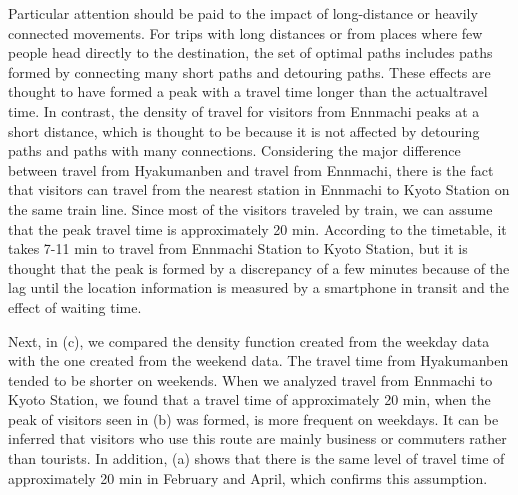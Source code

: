 \documentclass[conference]{IEEEtran}
\begin{document}
Particular attention should be paid to the impact of long-distance or heavily connected movements.
For trips with long distances or from places where few people head directly to the destination, the set of optimal paths includes paths formed by connecting many short paths and detouring paths.
These effects are thought to have formed a peak with a travel time longer than the actualtravel time.
In contrast, the density of travel for visitors from Ennmachi peaks at a short distance, which is thought to be because it is not affected by detouring paths and paths with many connections.
Considering the major difference between travel from Hyakumanben and travel from Ennmachi, there is the fact that visitors can travel from the nearest station in Ennmachi to Kyoto Station on the same train line.
Since most of the visitors traveled by train, we can assume that the peak travel time is approximately 20 min.
According to the timetable, it takes 7-11 min to travel from Ennmachi Station to Kyoto Station, but it is thought that the peak is formed by a discrepancy of a few minutes because of the lag until the location information is measured by a smartphone in transit and the effect of waiting time.
\par Next, in (c), we compared the density function created from the weekday data with the one created from the weekend data.
The travel time from Hyakumanben tended to be shorter on weekends.
When we analyzed travel from Ennmachi to Kyoto Station, we found that a travel time of approximately 20 min, when the peak of visitors seen in (b) was formed, is more frequent on weekdays.
It can be inferred that visitors who use this route are mainly business or commuters rather than tourists.
In addition, (a) shows that there is the same level of travel time of approximately 20 min in February and April, which confirms this assumption.
\end{document}

